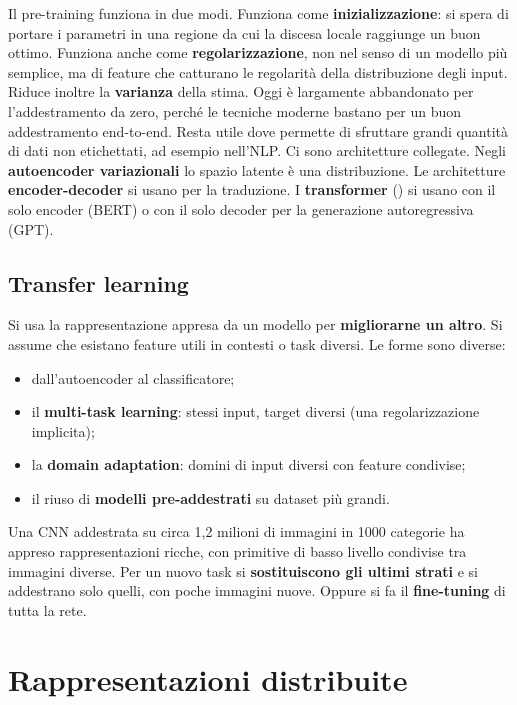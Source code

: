 Il pre-training funziona in due modi. Funziona come \textbf{inizializzazione}: si spera di portare i parametri in
una regione da cui la discesa locale raggiunge un buon ottimo. Funziona anche come \textbf{regolarizzazione}, non
nel senso di un modello più semplice, ma di feature che catturano le regolarità della distribuzione degli input.
Riduce inoltre la \textbf{varianza} della stima. Oggi è largamente abbandonato per l'addestramento da zero, perché
le tecniche moderne bastano per un buon addestramento end-to-end. Resta utile dove permette di sfruttare grandi
quantità di dati non etichettati, ad esempio nell'NLP. Ci sono architetture collegate. Negli
\textbf{autoencoder variazionali} lo spazio latente è una distribuzione. Le architetture
\textbf{encoder-decoder} si usano per la traduzione. I \textbf{transformer} () si usano con
il solo encoder (BERT) o con il solo decoder per la generazione autoregressiva (GPT).

\subsection{Transfer learning}
\label{sec:transfer}

Si usa la rappresentazione appresa da un modello per \textbf{migliorarne un altro}. Si assume che esistano feature
utili in contesti o task diversi. Le forme sono diverse:
\begin{itemize}
  \item dall'autoencoder al classificatore;
  \item il \textbf{multi-task learning}: stessi input, target diversi (una regolarizzazione implicita);
  \item la \textbf{domain adaptation}: domini di input diversi con feature condivise;
  \item il riuso di \textbf{modelli pre-addestrati} su dataset più grandi.
\end{itemize}

\begin{esempio}
Una CNN addestrata su circa 1,2 milioni di immagini in 1000 categorie ha appreso rappresentazioni ricche, con
primitive di basso livello condivise tra immagini diverse. Per un nuovo task si \textbf{sostituiscono gli ultimi
strati} e si addestrano solo quelli, con poche immagini nuove. Oppure si fa il \textbf{fine-tuning} di tutta la rete.
\end{esempio}

\section{Rappresentazioni distribuite}
\label{sec:distribuite}

